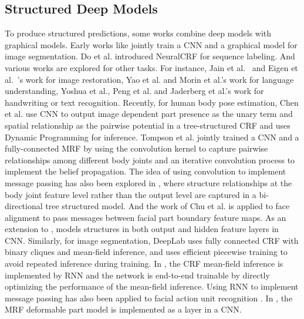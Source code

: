 \documentclass{article}
\begin{document}
\subsection{Structured Deep Models} \label{sub:structured_deep_models}
  To produce structured predictions, some works combine deep models with graphical models. Early works like \cite{Ning2005segmentation} jointly train a CNN and a graphical model for image segmentation. Do et al.\cite{Do2010neuralCRF} introduced NeuralCRF for sequence labeling. And various works are explored for other tasks. For instance, Jain et al.~\cite{Jain2007imagerestoration} and Eigen et al.~\cite{Eigen2013imagerestoration}'s work for image restoration, Yao et al. and Morin et al.'s work \cite{Yao2014language,Morin2005language} for language understanding, Yoshua et al., Peng et al. and Jaderberg et al.'s work \cite{Yoshua1994handwritten-word-recog,Peng2009handwriting,Jaderberg2014Text-Recognition} for handwriting or text recognition. 
  Recently, for human body pose estimation, Chen et al.\cite{Chen2014pose-CRF-segmentation} use CNN to output image dependent part presence as the unary term and spatial relationship as the pairwise potential in a tree-structured CRF and uses Dynamic Programming for inference. Tompson et al. \cite{Tompson14heatmapPose,Tompson2015joint-cnn-mrf-objloc} jointly trained a CNN and a fully-connected MRF by using the convolution kernel to capture pairwise relationships among different body joints and an iterative convolution process to implement the belief propagation. The idea of using convolution to implement message passing has also been explored in \cite{chu2016structure-cnn-pose}, where structure relationships at the body joint feature level rather than the output level are captured in a bi-directional tree structured model. And the work of Chu et al.\cite{chu2016structure-cnn-pose} is applied to face alignment \cite{wayne2018LAB} to pass messages between facial part boundary feature maps. As an extension to \cite{chu2016structure-cnn-pose}, \cite{chu2016hidden-crf-cnn-pose} models structures in both output and hidden feature layers in CNN. Similarly, for image segmentation, DeepLab \cite{Chen2018DeepLab} uses fully connected CRF with binary cliques and mean-field inference, and \cite{Lin2016piecewiseSegmentation} uses efficient piecewise training to avoid repeated inference during training. In \cite{Zheng2015CRFasRNN}, the CRF mean-field inference is implemented by RNN and the network is end-to-end trainable by directly optimizing the performance of the mean-field inference. Using RNN to implement message passing has also been applied to facial action unit recognition \cite{Corneanu2018DeepSI-AU}. In \cite{Girshick2015DeformablePartCNN}, the MRF deformable part model is implemented as a layer in a CNN. 
\end{document}
